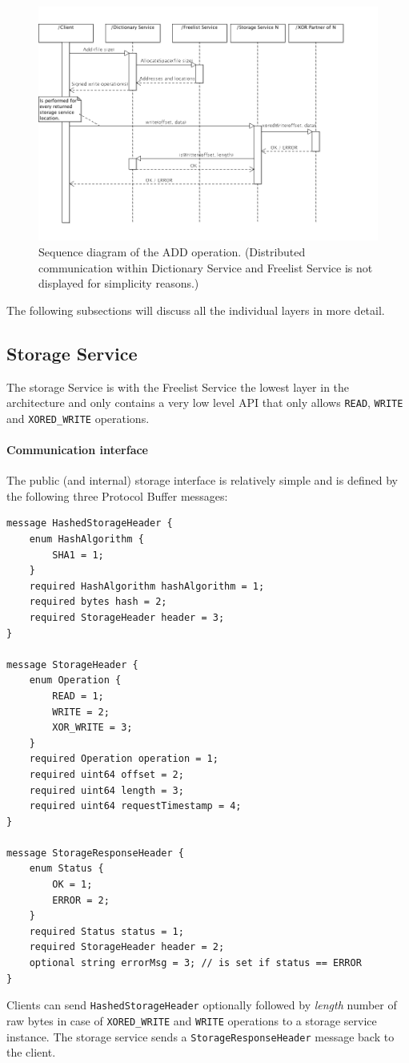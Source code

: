 \documentclass[12pt,a4paper]{scrartcl}
\begin{document}
\begin{figure}[H]
\centering
\includegraphics[width=\textwidth,trim=0 2cm 3cm 1cm,clip=true]{diagrams/add-operation.png}
\caption{Sequence diagram of the ADD operation. (Distributed communication within Dictionary Service and Freelist Service is not displayed for simplicity reasons.)}
\label{fig:sequence-add}
\end{figure}

The following subsections will discuss all the individual layers in more detail.


\subsection{Storage Service}
The storage Service is with the Freelist Service the lowest layer in the architecture and only contains a very low level API that only allows \verb|READ|, \verb|WRITE| and \verb|XORED_WRITE| operations.

\paragraph{Communication interface}
The public (and internal) storage interface is relatively simple and is defined by the following three Protocol Buffer messages:
\begin{verbatim}
message HashedStorageHeader {
    enum HashAlgorithm {
        SHA1 = 1;
    }
    required HashAlgorithm hashAlgorithm = 1;
    required bytes hash = 2;
    required StorageHeader header = 3;
}

message StorageHeader {
    enum Operation {
        READ = 1;
        WRITE = 2;
        XOR_WRITE = 3;
    }
    required Operation operation = 1;
    required uint64 offset = 2;
    required uint64 length = 3;
    required uint64 requestTimestamp = 4;
}

message StorageResponseHeader {
    enum Status {
        OK = 1;
        ERROR = 2;
    }
    required Status status = 1;
    required StorageHeader header = 2;
    optional string errorMsg = 3; // is set if status == ERROR
}
\end{verbatim}
Clients can send \verb|HashedStorageHeader| optionally followed by \emph{length} number of raw bytes in case of \verb|XORED_WRITE| and \verb|WRITE| operations to a storage service instance. The storage service sends a \verb|StorageResponseHeader| message back to the client.
\end{document}
